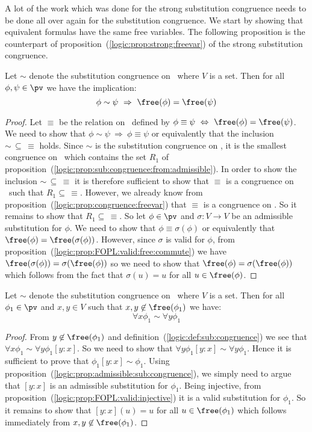 A lot of the work which was done for the strong substitution
congruence needs to be done all over again for the substitution
congruence. We start by showing that equivalent formulas have the
same free variables. The following proposition is the counterpart of
proposition~(\ref{logic:prop:strong:freevar}) of the strong
substitution congruence.

\begin{prop}\label{logic:prop:sub:congruence:freevar}
Let $\sim$ denote the substitution congruence on \pv\ where $V$ is a
set. Then for all $\phi,\psi\in\pv$ we have the implication:
    \[
    \phi\sim\psi\ \Rightarrow\ \free(\phi)=\free(\psi)
    \]
\end{prop}
\begin{proof}
Let $\equiv$ be the relation on \pv\ defined by $\phi\equiv\psi\
\Leftrightarrow\ \free(\phi)=\free(\psi)$. We need to show that
$\phi\sim\psi\ \Rightarrow\ \phi\equiv\psi$ or equivalently that the
inclusion $\sim\,\subseteq\,\equiv$ holds. Since $\sim$ is the
substitution congruence on \pv, it is the smallest congruence on
\pv\ which contains the set $R_{1}$ of
proposition~(\ref{logic:prop:sub:congruence:from:admissible}). In
order to show the inclusion $\sim\,\subseteq\,\equiv$ it is
therefore sufficient to show that $\equiv$ is a congruence on \pv\
such that $R_{1}\subseteq\,\equiv$. However, we already know from
proposition~(\ref{logic:prop:congruence:freevar}) that $\equiv$ is a
congruence on \pv. So it remains to show that
$R_{1}\subseteq\,\equiv$. So let $\phi\in\pv$ and $\sigma:V\to V$ be
an admissible substitution for $\phi$. We need to show that
$\phi\equiv\sigma(\phi)$ or equivalently that
$\free(\phi)=\free(\sigma(\phi))$. However, since $\sigma$ is valid
for $\phi$, from
proposition~(\ref{logic:prop:FOPL:valid:free:commute}) we have
$\free(\sigma(\phi))=\sigma(\free(\phi))$ so we need to show that
$\free(\phi)=\sigma(\free(\phi))$ which follows from the fact that
$\sigma(u)=u$ for all $u\in\free(\phi)$.
\end{proof}

\begin{prop}\label{logic:prop:FOPL:freesubcong:xy:not:free}
Let $\sim$ denote the substitution congruence on \pv\ where $V$ is a
set. Then for all $\phi_{1}\in\pv$ and $x,y\in V$ such that
$x,y\not\in\free(\phi_{1})$ we have:
    \[
    \forall x\phi_{1}\sim\forall y\phi_{1}
    \]
\end{prop}
\begin{proof}
From $y\not\in\free(\phi_{1})$ and
definition~(\ref{logic:def:sub:congruence}) we see that $\forall
x\phi_{1}\sim\forall y\phi_{1}[y\!:\!x]$. So we need to show that
$\forall y\phi_{1}[y\!:\!x]\sim\forall y\phi_{1}$. Hence it is
sufficient to prove that $\phi_{1}[y\!:\!x]\sim\phi_{1}$. Using
proposition~(\ref{logic:prop:admissible:sub:congruence}), we simply
need to argue that $[y\!:\!x]$ is an admissible substitution for
$\phi_{1}$. Being injective, from
proposition~(\ref{logic:prop:FOPL:valid:injective}) it is a valid
substitution for $\phi_{1}$. So it remains to show that
$[y\!:\!x](u)=u$ for all $u\in\free(\phi_{1})$ which follows
immediately from $x,y\not\in\free(\phi_{1})$.
\end{proof}
